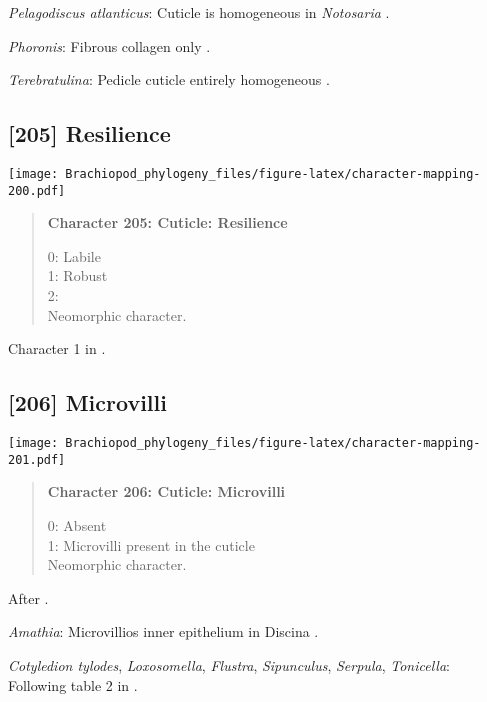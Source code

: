 \documentclass[openany]{book}
\theoremstyle{definition}
\theoremstyle{definition}
\theoremstyle{definition}
\theoremstyle{remark}
\begin{document}
\hypertarget{Pelagodiscus_atlanticus-coding-204}{}
\emph{Pelagodiscus atlanticus}: Cuticle is homogeneous in
\emph{Notosaria} \citep{BereiterHahn1984, Williams1997Introduction}.

\hypertarget{Phoronis-coding-204}{}
\emph{Phoronis}: Fibrous collagen only \citep{BereiterHahn1984}.

\hypertarget{Terebratulina-coding-204}{}
\emph{Terebratulina}: Pedicle cuticle entirely homogeneous
\citep{Williams1997Introduction}.

\subsection*{{[}205{]} Resilience}\label{resilience}

\texttt{[image: Brachiopod\_phylogeny\_files/figure-latex/character-mapping-200.pdf]}

\begin{quote}
\textbf{Character 205: Cuticle: Resilience}

0: Labile\\
1: Robust\\
2:\\
Neomorphic character.
\end{quote}

Character 1 in \citet{Haszprunar2000}.

\subsection*{{[}206{]} Microvilli}\label{microvilli}

\texttt{[image: Brachiopod\_phylogeny\_files/figure-latex/character-mapping-201.pdf]}

\begin{quote}
\textbf{Character 206: Cuticle: Microvilli}

0: Absent\\
1: Microvilli present in the cuticle\\
Neomorphic character.
\end{quote}

After \citet{Borisanova2015}.

\hypertarget{Amathia-coding-206}{}
\emph{Amathia}: Microvillios inner epithelium in Discina
\citep{Williams1997Introduction}.

\hypertarget{Cotyledion_tylodes-coding-206}{}
\emph{Cotyledion tylodes}, \emph{Loxosomella}, \emph{Flustra},
\emph{Sipunculus}, \emph{Serpula}, \emph{Tonicella}: Following table 2
in \citet{Borisanova2015}.
\end{document}
